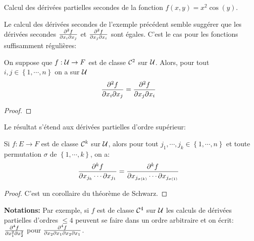 \begin{exemple}
Calcul des dérivées partielles secondes de la fonction
$
f(x,y)= x^2\cos(y)
$.
\pl{\rep{5cm}}
\end{exemple}

\sld{\vfill\pagebreak[5]}%
Le calcul des dérivées secondes de l'exemple précédent semble suggérer que les dérivées secondes $\frac{\partial^2 f}{\partial x_i \partial x_j}$ et $\frac{\partial^2 f}{\partial x_j \partial x_i} $ sont égales. C'est le cas pour les fonctions suffisamment régulières:
\begin{theorem}
	[(Schwarz)]
	On suppose que $f:\mathcal{U} \to F$ est de classe $\mathcal{C}^2$ sur $\mathcal{U}$. Alors,  pour tout $i,j \in \left\{ 1,\cdots,n \right\}$ on a sur $\mathcal{U}$  %
	\[\frac{\partial^2 f}{\partial x_i \partial x_j}=\frac{\partial^2 f}{\partial x_j \partial x_i} \]
\end{theorem}

\begin{proof}
	\pl{\rep{25cm}}	
\end{proof}


\sld{\vfill\pagebreak[5]}%
Le résultat s'étend aux dérivées partielles d'ordre supérieur: 
\begin{proposition}
	Si $f:E\to F$ est de classe $\mathcal{C}^k$ sur $\mathcal{U}$, alors pour tout $j_1,\cdots,j_k \in \left\{ 1,\cdots,n \right\}$ et toute permutation $\sigma$ de $\left\{ 1,\cdots,k \right\}$, on a:
	\[
		\frac{\partial^k f}{ \partial x_{j_k} \cdots \partial x_{j_1}  }	= \frac{\partial^k f}{ \partial x_{j_{\sigma(k)}} \cdots \partial x_{j_{\sigma(1)}}  }
	\]
\end{proposition}

\begin{proof}
	C'est un corollaire du théorème de Schwarz.
\end{proof}

{\bf\sffamily Notations: }  
	Par exemple, si $f$ est de classe $\mathcal{C}^4$ sur $\mathcal{U}$ les calculs de dérivées partielles d'ordres $\leq 4$ peuvent se faire dans un ordre arbitraire et on écrit: $\frac{\partial^{4} f}{\partial x_1^{2}\partial x_2^{2} }$ pour $\frac{\partial^{4} f}{\partial x_2 \partial x_1 \partial x_2   \partial x_1 }$. 

